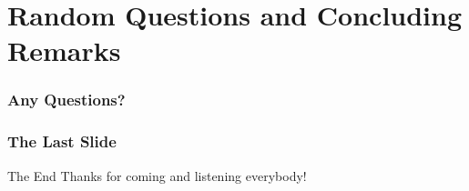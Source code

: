 \documentclass{beamer}
\begin{document}
\section{Random Questions and Concluding Remarks}
\begin{frame}\frametitle{Any Questions?}
	
\end{frame}
\begin{frame}\frametitle{The Last Slide}
	\begin{block}{The End}
		Thanks for coming and listening everybody!
	\end{block}
\end{frame}
\end{document}

